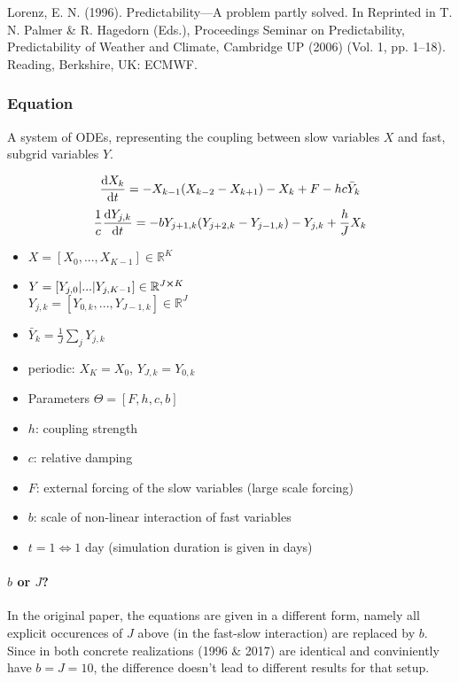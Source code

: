 \documentclass[11pt]{article}
\newcommand{\R}{{\mathbb{R}}}
\begin{document}
Lorenz, E. N. (1996). Predictability—A problem partly solved. In Reprinted in T. N. Palmer \& R. Hagedorn (Eds.), Proceedings Seminar on
Predictability, Predictability of Weather and Climate, Cambridge UP (2006) (Vol. 1, pp. 1–18). Reading, Berkshire, UK: ECMWF.

\subsubsection{Equation}
\label{sec:org694921b}

A system of ODEs, representing the coupling between slow variables \(X\) and fast, subgrid
variables \(Y\).

$$ \dv{X_k}{t} =                 - X_{k-1}(X_{k-2} - X_{k+1}) - X_k + F - hc \bar{Y}_k $$
$$ \frac{1}{c} \dv{Y_{j,k}}{t} = -bY_{j+1,k}(Y_{j+2,k} - Y_{j-1, k}) - Y_{j,k} + \frac{h}{J}X_k$$

\begin{itemize}
\item \(X = [X_0, ..., X_{K-1}] \in \R^K\)
\item \(Y = [Y_{j, 0} | ... | Y_{j, K-1}] \in \R^{J \cross K}\) \\
\(Y_{j,k} = [Y_{0,k}, ..., Y_{J-1,k}] \in  \R^J\)
\item \(\bar{Y}_k = \frac{1}{J}\sum_j Y_{j,k}\)
\item periodic: \(X_K = X_0\), \(Y_{J,k} = Y_{0,k}\)
\item Parameters \(\Theta = [F, h, c, b]\)
\item \(h\): coupling strength
\item \(c\): relative damping
\item \(F\): external forcing of the slow variables (large scale forcing)
\item \(b\): scale of non-linear interaction of fast variables
\item \(t = 1 \Leftrightarrow 1\) day (simulation duration is given in days)
\end{itemize}

\paragraph{\(b\) or \(J\)?}
\label{sec:orgdbb37fa}
In the original paper, the equations are given in a different form, namely all
explicit occurences of \(J\) above (in the fast-slow interaction) are replaced by
\(b\). Since in both concrete realizations (1996 \& 2017) are identical and conviniently
have \(b=J=10\), the difference doesn't lead to different results for that setup.
\end{document}
